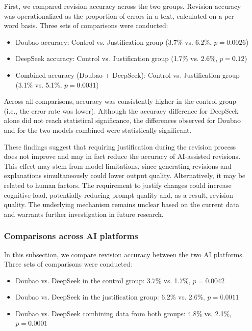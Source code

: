\documentclass[english]{textolivre}
\begin{document}
First, we compared revision accuracy across the two groups. Revision accuracy was operationalized as the proportion of errors in a text, calculated on a per-word basis.
Three sets of comparisons were conducted:

\begin{itemize}
    \item Doubao accuracy: Control vs. Justification group (3.7\% vs. 6.2\%, $p = 0.0026$)
    \item DeepSeek accuracy: Control vs. Justification group (1.7\% vs. 2.6\%, $p = 0.12$)
    \item Combined accuracy (Doubao + DeepSeek): Control vs. Justification group (3.1\% vs. 5.1\%, $p = 0.0031$)
\end{itemize}

Across all comparisons, accuracy was consistently higher in the control group (i.e., the error rate was lower). Although the accuracy difference for DeepSeek alone did not reach statistical significance, the differences observed for Doubao and for the two models combined were statistically significant.

These findings suggest that requiring justification during the revision process does not improve and may in fact reduce the accuracy of AI-assisted revisions. This effect may stem from model limitations, since generating revisions and explanations simultaneously could lower output quality. Alternatively, it may be related to human factors. The requirement to justify changes could increase cognitive load, potentially reducing prompt quality and, as a result, revision quality. The underlying mechanism remains unclear based on the current data and warrants further investigation in future research.

\subsubsection{Comparisons across AI platforms}
In this subsection, we compare revision accuracy between the two AI platforms. Three sets of comparisons were conducted:

\begin{itemize}
    \item Doubao vs. DeepSeek in the control group: 3.7\% vs. 1.7\%, $p = 0.0042$
    \item Doubao vs. DeepSeek in the justification group: 6.2\% vs. 2.6\%, $p = 0.0011$
    \item Doubao vs. DeepSeek combining data from both groups: 4.8\% vs. 2.1\%, $p = 0.0001$
\end{itemize}
\end{document}

